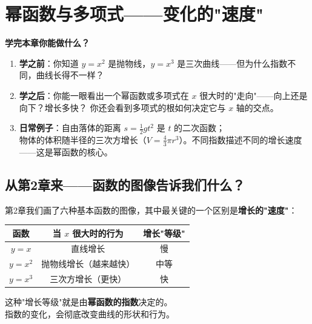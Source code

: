 
\chapter{幂函数与多项式——变化的"速度"}

\begin{applicationbox}
\textbf{学完本章你能做什么？}
\begin{enumerate}
  \item \textbf{学之前}：你知道 \(y = x^2\) 是抛物线，\(y = x^3\) 是三次曲线——但为什么指数不同，曲线长得不一样？
  \item \textbf{学之后}：你能一眼看出一个幂函数或多项式在 \(x\) 很大时的"走向"——向上还是向下？增长多快？
        你还会看到多项式的根如何决定它与 \(x\) 轴的交点。
  \item \textbf{日常例子}：自由落体的距离 \(s = \frac{1}{2}gt^2\) 是 \(t\) 的二次函数；\\
        物体的体积随半径的三次方增长（\(V = \frac{4}{3}\pi r^3\)）。不同指数描述不同的增长速度——这是幂函数的核心。
\end{enumerate}
\end{applicationbox}


\section{从第2章来——函数的图像告诉我们什么？}

第2章我们画了六种基本函数的图像，其中最关键的一个区别是\textbf{增长的"速度"}：

\begin{center}
\begin{tabular}{c|c|c}
\textbf{函数} & \textbf{当 \(x\) 很大时的行为} & \textbf{增长"等级"} \\
\hline
\(y = x\) & 直线增长 & 慢 \\
\(y = x^2\) & 抛物线增长（越来越快） & 中等 \\
\(y = x^3\) & 三次方增长（更快） & 快 \\
\end{tabular}
\end{center}

这种"增长等级"就是由\textbf{幂函数的指数}决定的。\\
指数的变化，会彻底改变曲线的形状和行为。


